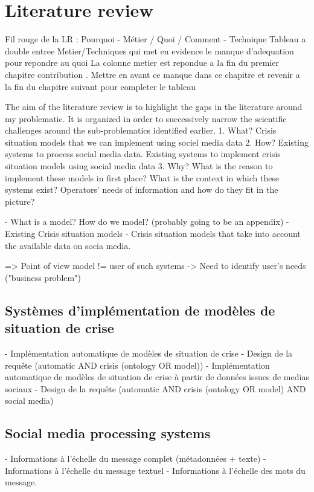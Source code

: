 \chapter{Literature review}

Fil rouge de la LR : Pourquoi - Métier / Quoi / Comment - Technique
Tableau a double entree Metier/Techniques qui met en evidence le manque d'adequation pour repondre au quoi
La colonne metier est repondue a la fin du premier chapitre contribution . Mettre en avant ce manque dans ce chapitre et revenir a la fin du chapitre suivant pour completer le tableau

The aim of the literature review is to highlight the gaps in the literature around my problematic.
It is organized in order to successively narrow the scientific challenges around the sub-problematics identified earlier.
1. What? Crisis situation models that we can implement using sociel media data
2. How? Existing systems to process social media data. Existing systems to implement crisis situation models using social media data
3. Why? What is the reason to implement these models in first place? What is the context in which these systems exist? Operators' needs of information and how do they fit in the picture?

- What is a model? How do we model? (probably going to be an appendix)
- Existing Crisis situation models
- Crisis situation models that take into account the available data on socia media.

=> Point of view model != user of such systems
-> Need to identify user's needs ("business problem")

\section{Systèmes d'implémentation de modèles de situation de crise}
- Implémentation automatique de modèles de situation de crise
- Design de la requête (automatic AND crisis (ontology OR model))
- Implémentation automatique de modèles de situation de crise à partir de données issues de medias sociaux
- Design de la requête (automatic AND crisis (ontology OR model) AND social media)

\section{Social media processing systems}
- Informations à l'échelle du message complet (métadonnées + texte)
- Informations à l'échelle du message textuel
- Informations à l'échelle des mots du message.

